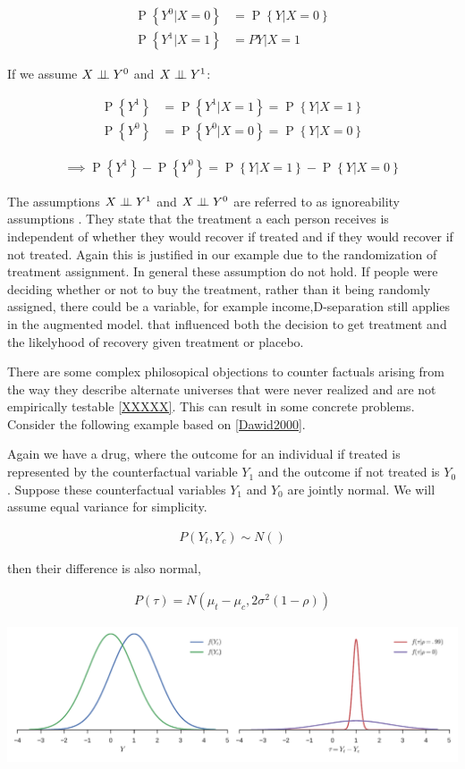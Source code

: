 \documentclass[11pt,a4paper,oneside]{book}
\newcommand{\eq}[1]{\begin{align*}#1\end{align*}}
\renewcommand{\P}[1]{\operatorname{P}\left\{#1\right\}}
\newcommand{\cf}[2]{{#1}_{#2}}
\begin{document}
\eq{
\P{Y^{0}|X=0}&= \P{Y|X=0}\\
\P{Y^{1}|X=1}&=P{Y|X=1}
}

If we assume $X \perp\!\!\!\perp Y^{0}$ and $X \perp\!\!\!\perp Y^{1}$:

\eq{
\P{Y^{1}} &= \P{Y^{1}|X=1} = \P{Y|X=1} \\
\P{Y^{0}} &= \P{Y^{0}|X=0} = \P{Y|X=0}
}

\eq{
\implies \P{Y^{1}}-\P{Y^{0}} = \P{Y|X=1} - \P{Y|X=0}
}

The assumptions $X \perp\!\!\!\perp Y^{1}$ and $X \perp\!\!\!\perp Y^{0}$  are referred to as ignoreability assumptions \cite{Rosenbaum1983}. They state that the treatment a each person receives is independent of whether they would recover if treated and if they would recover if not treated. Again this is justified in our example due to the randomization of treatment assignment. In general these assumption do not hold. If people were deciding whether or not to buy the treatment, rather than it being randomly assigned, there could be a variable, for example income,D-separation still applies in the augmented model. that influenced both the decision to get treatment and the likelyhood of recovery given treatment or placebo.


There are some complex philosopical objections to counter factuals arising from the way they describe alternate universes that were never realized and are not empirically testable \ref{XXXXX}. This can result in some concrete problems. Consider the following example based on  \ref{Dawid2000}.

Again we have a drug, where the outcome for an individual if treated is represented by the counterfactual variable $\cf{Y}{1}$ and the outcome if not treated is $\cf{Y}{0}$. Suppose these counterfactual variables $\cf{Y}{1}$ and $\cf{Y}{0}$ are jointly normal. We will assume equal variance for simplicity.

\eq{
P(Y_t,Y_c) \sim N()
}

then their difference is also normal,

\eq{
P(\tau) = N(\mu_t - \mu_c,2\sigma^{2}(1-\rho))
}

\includegraphics[scale=.6]{figures/counterfactual_nonidentify.pdf}
\end{document}
